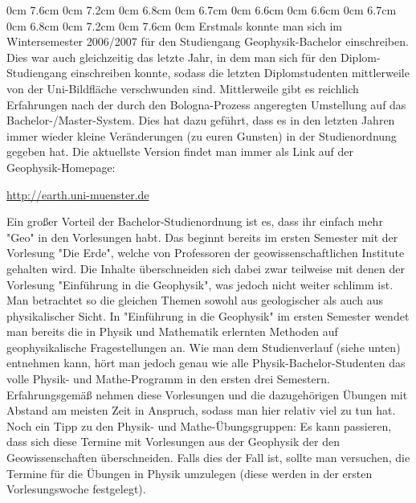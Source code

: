 \begin{multicols}{2}
0cm 7.6cm
0cm 7.2cm
0cm 6.8cm
0cm 6.7cm
0cm 6.6cm
0cm 6.6cm
0cm 6.7cm
0cm 6.8cm
0cm 7.2cm
0cm 7.6cm
0cm \columnwidth
Erstmals konnte man sich im Wintersemester 2006/2007 für den Studiengang Geophysik-Bachelor einschreiben. Dies war auch gleichzeitig das letzte Jahr, in dem man sich für den Diplom-Studiengang einschreiben konnte, sodass die letzten Diplomstudenten mittlerweile von der Uni-Bildfläche verschwunden sind. Mittlerweile gibt es reichlich Erfahrungen nach der durch den Bologna-Prozess angeregten Umstellung auf das Bachelor-/Master-System. Dies hat dazu geführt, dass es in den letzten Jahren immer wieder kleine Veränderungen (zu euren Gunsten) in der Studienordnung gegeben hat. Die aktuellste Version findet man immer als Link auf der Geophysik-Homepage:
\begin{center}
\url{http://earth.uni-muenster.de}
\end{center}

Ein großer Vorteil der Bachelor-Studienordnung ist es, dass ihr einfach mehr "Geo" in den Vorlesungen habt. Das beginnt bereits im ersten Semester mit der Vorlesung "Die Erde", welche von Professoren der geowissenschaftlichen Institute gehalten wird. Die Inhalte überschneiden sich dabei zwar teilweise mit denen der Vorlesung "Einführung in die Geophysik", was jedoch nicht weiter schlimm ist. Man betrachtet so die gleichen Themen sowohl aus geologischer als auch aus physikalischer Sicht. In "Einführung in die Geophysik" im ersten Semester wendet man bereits die in Physik und Mathematik erlernten Methoden auf geophysikalische Fragestellungen an. Wie man dem Studienverlauf (siehe unten) entnehmen kann, hört man jedoch genau wie alle Physik-Bachelor-Studenten das volle Physik- und Mathe-Programm in den ersten drei Semestern. Erfahrungsgemäß nehmen diese Vorlesungen und die dazugehörigen Übungen mit Abstand am meisten Zeit in Anspruch, sodass man hier relativ viel zu tun hat. Noch ein Tipp zu den Physik- und Mathe-Übungsgruppen: Es kann passieren, dass sich diese Termine mit Vorlesungen aus der Geophysik der den Geowissenschaften überschneiden. Falls dies der Fall ist, sollte man versuchen, die Termine für die Übungen in Physik umzulegen (diese werden in der ersten Vorlesungswoche festgelegt).


\end{multicols}
